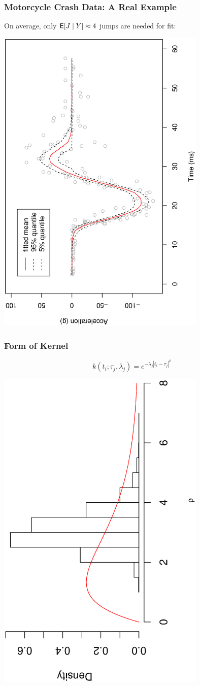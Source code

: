 \documentclass[]{beamer}
\newcommand{\bs}[2]{\begin{frame} \frametitle{#1}
{#2}
\end{frame} }
\begin{document}
\bs{ Motorcycle Crash Data: A Real Example}{
On average, only ${\sf{E}}[J\mid Y]\approx 4$ jumps are needed for fit:\par
    \includegraphics[angle=270,origin=l, clip=1,
     totalheight=6truecm,width=10cm]{motorfitted.ps}
}

\bs{Form of Kernel} {
\[k(t_i; \tau_j, \lambda_j) = e^{-\lambda_j |t_i - \tau_j|^\rho}\]

    \includegraphics[angle=270,origin=l, clip=1,
     totalheight=6truecm,width=10cm]{motor-rho.ps}
}
\end{document}
